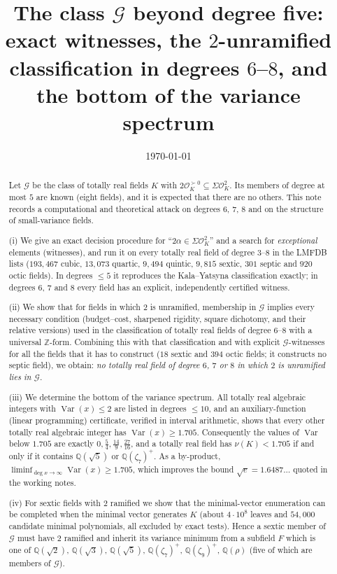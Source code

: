 \documentclass[11pt,reqno]{amsart}
\theoremstyle{plain}
\theoremstyle{definition}
\newcommand{\Z}{\mathbb{Z}}
\newcommand{\Q}{\mathbb{Q}}
\newcommand{\OK}{\mathcal{O}_K}
\newcommand{\Gcl}{\mathcal{G}}
\newcommand{\tp}{\succ 0}
\DeclareMathOperator{\Var}{Var}
\begin{document}
\title[The class $\Gcl$ beyond degree five]
{The class $\Gcl$ beyond degree five: exact witnesses, the $2$-unramified classification
in degrees $6$--$8$, and the bottom of the variance spectrum}
\author{}
\date{\today}

\begin{abstract}
Let $\Gcl$ be the class of totally real fields $K$ with $2\OK^{\tp}\subseteq\Sigma\OK^{2}$. Its
members of degree at most $5$ are known (eight fields), and it is expected that there are no others.
This note records a computational and theoretical attack on degrees $6$, $7$, $8$ and on the
structure of small-variance fields.

(i) We give an exact decision procedure for ``$2\alpha\in\Sigma\OK^{2}$'' and a search for
\emph{exceptional} elements (witnesses), and run it on every totally real field of degree $3$--$8$
in the LMFDB lists ($193{,}467$ cubic, $13{,}073$ quartic, $9{,}494$ quintic, $9{,}815$ sextic,
$301$ septic and $920$ octic fields). In degrees $\le5$ it reproduces the Kala--Yatsyna
classification exactly; in degrees $6$, $7$ and $8$ every field has an explicit, independently
certified witness.

(ii) We show that for fields in which $2$ is unramified, membership in $\Gcl$ implies every
necessary condition (budget--cost, sharpened rigidity, square dichotomy, and their relative
versions) used in the classification of totally real fields of degree $6$--$8$ with a universal
$\Z$-form. Combining this with that classification and with explicit $\Gcl$-witnesses for all the
fields that it has to construct ($18$ sextic and $394$ octic fields; it constructs no septic
field), we obtain:
\emph{no totally real field of degree $6$, $7$ or $8$ in which $2$ is unramified lies in $\Gcl$.}

(iii) We determine the bottom of the variance spectrum. All totally real algebraic integers with
$\Var(x)\le2$ are listed in degrees $\le10$, and an auxiliary-function (linear programming)
certificate, verified in interval arithmetic, shows that every other totally real algebraic integer
has $\Var(x)\ge 1.705$. Consequently the values of $\Var$ below $1.705$ are exactly
$0,\tfrac54,\tfrac{14}9,\tfrac{27}{16}$, and a totally real field has $\nu(K)<1.705$ if and only if it
contains $\Q(\sqrt5)$ or $\Q(\zeta_7)^{+}$. As a by-product,
$\liminf_{\deg x\to\infty}\Var(x)\ge1.705$, which improves the bound $\sqrt e=1.6487\ldots$ quoted
in the working notes.

(iv) For sextic fields with $2$ ramified we show that the minimal-vector enumeration can be
completed when the minimal vector generates $K$ (about $4\cdot10^{8}$ leaves and $54{,}000$
candidate minimal polynomials, all excluded by exact tests). Hence a sextic member of $\Gcl$ must have $2$ ramified and inherit its
variance minimum from a subfield $F$ which is one of $\Q(\sqrt2)$, $\Q(\sqrt3)$, $\Q(\sqrt5)$,
$\Q(\zeta_7)^{+}$, $\Q(\zeta_9)^{+}$, $\Q(\rho)$ (five of which are members of $\Gcl$).


\end{abstract}
\end{document}

